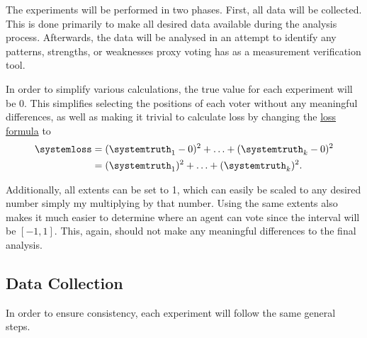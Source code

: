 The experiments will be performed in two phases.
First, all data will be collected.
This is done primarily to make all desired data available during the analysis
process.
Afterwards, the data will be analysed in an attempt to identify any patterns,
strengths, or weaknesses proxy voting has as a measurement verification tool.

In order to simplify various calculations, the true value for each experiment
will be 0.
This simplifies selecting the positions of each voter without any meaningful
differences, as well as making it trivial to calculate loss by changing the
\hyperref[eq:loss]{loss formula} to
\begin{align}
    \systemloss &=
    (\systemtruth_1 - 0)^2 +
    \mathellipsis +
    (\systemtruth_k - 0)^2
    \nonumber \\
    &=
    (\systemtruth_1)^2 +
    \mathellipsis +
    (\systemtruth_k )^2
    \text{.}\label{eq:adjusted-loss}
\end{align}

Additionally, all extents can be set to 1, which can easily be scaled to any
desired number simply my multiplying by that number.
Using the same extents also makes it much easier to determine where an agent
can vote since the interval will be $[-1, 1]$.
This, again, should not make any meaningful differences to the final analysis.

\subsection{Data Collection}\label{subsec:data-collection}
In order to ensure consistency, each experiment will follow the same general
steps.

